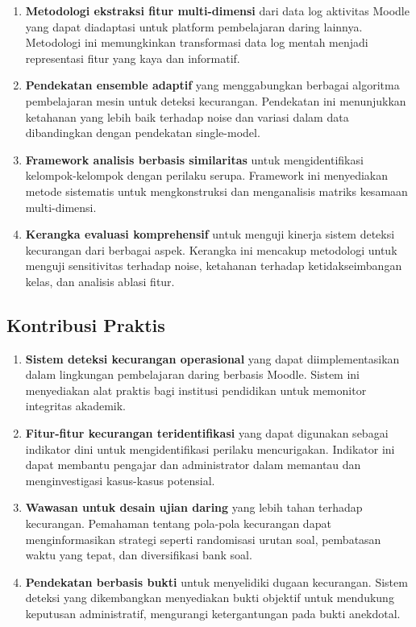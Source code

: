 \begin{enumerate}
    \item \textbf{Metodologi ekstraksi fitur multi-dimensi} dari data log aktivitas Moodle yang dapat diadaptasi untuk platform pembelajaran daring lainnya. Metodologi ini memungkinkan transformasi data log mentah menjadi representasi fitur yang kaya dan informatif.
    
    \item \textbf{Pendekatan ensemble adaptif} yang menggabungkan berbagai algoritma pembelajaran mesin untuk deteksi kecurangan. Pendekatan ini menunjukkan ketahanan yang lebih baik terhadap noise dan variasi dalam data dibandingkan dengan pendekatan single-model.
    
    \item \textbf{Framework analisis berbasis similaritas} untuk mengidentifikasi kelompok-kelompok dengan perilaku serupa. Framework ini menyediakan metode sistematis untuk mengkonstruksi dan menganalisis matriks kesamaan multi-dimensi.
    
    \item \textbf{Kerangka evaluasi komprehensif} untuk menguji kinerja sistem deteksi kecurangan dari berbagai aspek. Kerangka ini mencakup metodologi untuk menguji sensitivitas terhadap noise, ketahanan terhadap ketidakseimbangan kelas, dan analisis ablasi fitur.
\end{enumerate}

\subsection{Kontribusi Praktis}

\begin{enumerate}
    \item \textbf{Sistem deteksi kecurangan operasional} yang dapat diimplementasikan dalam lingkungan pembelajaran daring berbasis Moodle. Sistem ini menyediakan alat praktis bagi institusi pendidikan untuk memonitor integritas akademik.
    
    \item \textbf{Fitur-fitur kecurangan teridentifikasi} yang dapat digunakan sebagai indikator dini untuk mengidentifikasi perilaku mencurigakan. Indikator ini dapat membantu pengajar dan administrator dalam memantau dan menginvestigasi kasus-kasus potensial.
    
    \item \textbf{Wawasan untuk desain ujian daring} yang lebih tahan terhadap kecurangan. Pemahaman tentang pola-pola kecurangan dapat menginformasikan strategi seperti randomisasi urutan soal, pembatasan waktu yang tepat, dan diversifikasi bank soal.
    
    \item \textbf{Pendekatan berbasis bukti} untuk menyelidiki dugaan kecurangan. Sistem deteksi yang dikembangkan menyediakan bukti objektif untuk mendukung keputusan administratif, mengurangi ketergantungan pada bukti anekdotal.
\end{enumerate}

